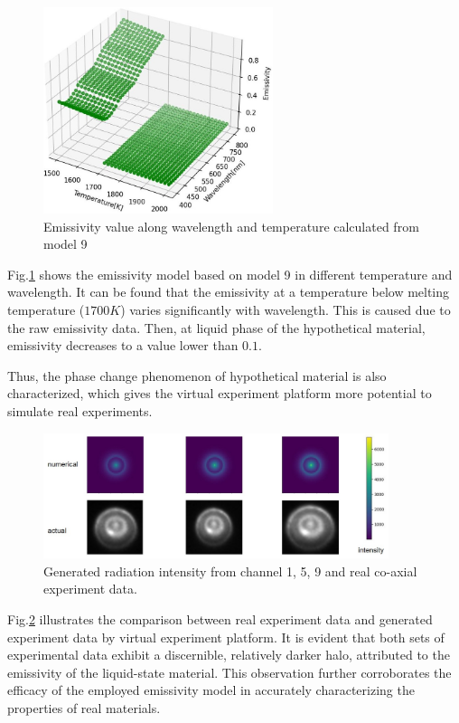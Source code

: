 \begin{figure}[htbp]
  \centering
  \includegraphics[width=0.6\textwidth]{figures/emissivity_model.jpg}
  \caption{Emissivity value along wavelength and temperature calculated from model 9}
  \label{fig: emissivity_model}
\end{figure}


Fig.\ref{fig: emissivity_model} shows the emissivity model based 
on model 9 in different temperature 
and wavelength. It can be found that the emissivity at a temperature 
below melting temperature ($1700K$) varies significantly with wavelength.
This is caused due to the raw emissivity data. Then, at liquid phase of 
the hypothetical material, emissivity decreases to a value lower than $0.1$.


Thus, the phase change phenomenon of hypothetical material is also characterized, 
which gives the virtual experiment platform more potential to simulate 
real experiments.

\begin{figure}[htbp]
  \centering
  \includegraphics[width=0.9\textwidth]{figures/co-axial-raw.jpg}
  \caption{Generated radiation intensity from channel 1, 5, 9 and real co-axial experiment data.}
  \label{fig: real_virtual_comp}
\end{figure}


Fig.\ref{fig: real_virtual_comp} illustrates the comparison between real experiment data and 
generated experiment data by virtual experiment platform. 
It is evident that both sets of experimental data exhibit a discernible, relatively darker halo, 
attributed to the emissivity of the liquid-state material. This observation further corroborates 
the efficacy of the employed emissivity model in accurately characterizing the properties of real 
materials.


